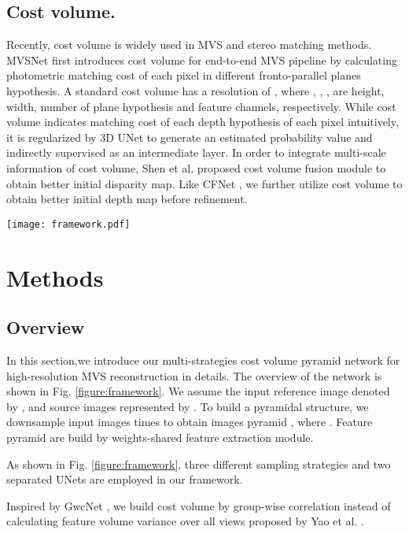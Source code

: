 \documentclass{article}
\begin{document}
\subsection{Cost volume.}
Recently, cost volume is widely used in MVS and stereo matching methods.
MVSNet \cite{yao2018mvsnet} first introduces cost volume for end-to-end MVS pipeline by calculating photometric matching cost of each pixel in different fronto-parallel planes hypothesis.
A standard cost volume has a resolution of , where , , ,  are height, width, number of plane hypothesis and feature channels, respectively.
While cost volume indicates matching cost of each depth hypothesis of each pixel intuitively, it is regularized by 3D UNet to generate an estimated probability value and indirectly supervised as an intermediate layer.
In order to integrate multi-scale information of cost volume, Shen et al. \cite{shen2021cfnet} proposed cost volume fusion module to obtain better initial disparity map.
Like CFNet \cite{shen2021cfnet}, we further utilize cost volume to obtain better initial depth map before refinement.
\begin{figure*}[!htb]
	\begin{center}
		\texttt{[image: framework.pdf]}\\
		\caption{The network structure of MSCVP-MVSNet. }
		\label{figure:framework}
	\end{center}
\end{figure*}

\section{Methods}
\label{sec:3}
\subsection{Overview}
In this section,we introduce our multi-strategies cost volume pyramid network for high-resolution MVS reconstruction in details.
The overview of the network is shown in Fig. \ref{figure:framework}.
We assume the input reference image denoted by , and source images represented by .
To build a pyramidal structure, we downsample input images  times to obtain images pyramid , where .
Feature pyramid  are build by weights-shared feature extraction module.

As shown in Fig. \ref{figure:framework}, three different sampling strategies and two separated UNets are employed in our framework.

Inspired by GwcNet \cite{guo2019group}, we build cost volume by group-wise correlation instead of calculating feature volume variance over all views proposed by Yao et al. \cite{yao2018mvsnet}.
\end{document}
